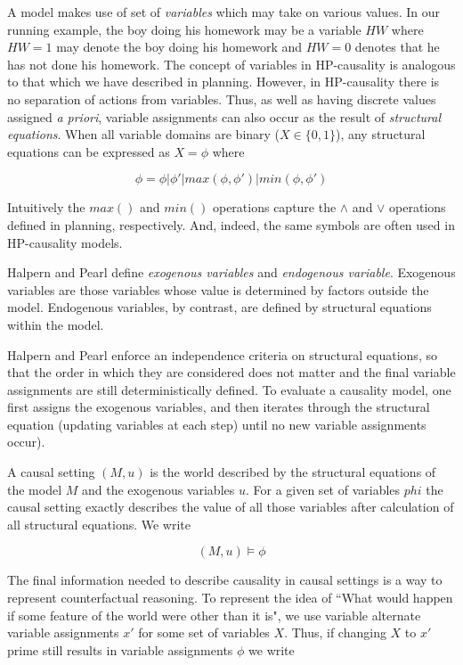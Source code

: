 \documentclass{article}
\theoremstyle{plain}
\theoremstyle{definition}
\begin{document}
A model makes use of set of \textit{variables} which may take on various values. In our running example, the boy doing his homework may be a variable $HW$ where $HW=1$ may denote the boy doing his homework and $HW=0$ denotes that he has not done his homework. The concept of variables in HP-causality is analogous to that which we have described in planning. However, in HP-causality there is no separation of actions from variables. Thus, as well as having discrete values assigned \textit{a priori}, variable assignments can also occur as the result of \textit{structural equations}. When all variable domains are binary ($X \in \{0,1\}$), any structural equations can be expressed as $X=\phi$ where

\[
\phi= \phi | \phi' | max(\phi, \phi') | min(\phi, \phi') 
\]

Intuitively the $max()$ and $min()$ operations capture the $\land$ and $\lor$ operations defined in planning, respectively. And, indeed, the same symbols are often used in HP-causality models.

Halpern and Pearl define \textit{exogenous variables} and \textit{endogenous variable}. Exogenous variables are those variables whose value is determined by factors outside the model. Endogenous variables, by contrast, are defined by structural equations within the model.

Halpern and Pearl enforce an independence criteria on structural equations, so that the order in which they are considered does not matter and the final variable assignments are still deterministically defined. To evaluate a causality model, one first assigns the exogenous variables, and then iterates through the structural equation (updating variables at each step) until no new variable assignments occur).

A causal setting $(M,u)$ is the world described by the structural equations of the model $M$ and the exogenous variables $u$. For a given set of variables $phi$ the causal setting exactly describes the value of all those variables after calculation of all structural equations. We write

\[
(M,u) \models \phi
\]

The final information needed to describe causality in causal settings is a way to represent counterfactual reasoning. To represent the idea of ``What would happen if some feature of the world were other than it is", we use variable alternate variable assignments $x'$ for some set of variables $X$. Thus, if changing $X$ to $x'$ prime still results in variable assignments $\phi$ we write
\end{document}

